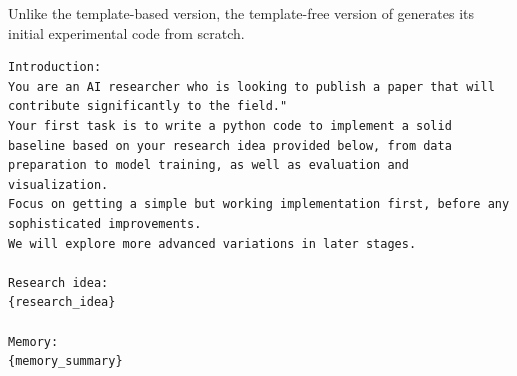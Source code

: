 \begin{appendices}
Unlike the template-based version, the template-free version of \ouralgo generates its initial experimental code from scratch.
\begin{tcolorbox}[breakable, colback=orange!5!white, colframe=orange!80!black, title=Initial Experiment Implementation Prompt]
\begin{Verbatim}[breaklines, breaksymbol={}, breaksymbolleft={}, fontsize=\small]
Introduction:
You are an AI researcher who is looking to publish a paper that will contribute significantly to the field."
Your first task is to write a python code to implement a solid baseline based on your research idea provided below, from data preparation to model training, as well as evaluation and visualization.
Focus on getting a simple but working implementation first, before any sophisticated improvements.
We will explore more advanced variations in later stages.

Research idea:
{research_idea}

Memory:
{memory_summary}


\end{Verbatim}
\end{tcolorbox}
\end{appendices}
